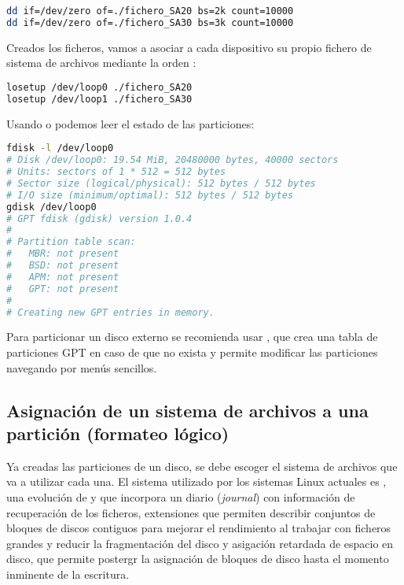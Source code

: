 \begin{lstlisting}[language=Bash]
dd if=/dev/zero of=./fichero_SA20 bs=2k count=10000
dd if=/dev/zero of=./fichero_SA30 bs=3k count=10000
\end{lstlisting}

Creados los ficheros, vamos a asociar a cada dispositivo  su propio fichero de sistema de archivos mediante la orden :

\begin{lstlisting}[language=Bash]
losetup /dev/loop0 ./fichero_SA20
losetup /dev/loop1 ./fichero_SA30
\end{lstlisting}

Usando  o  podemos leer el estado de las particiones:

\begin{lstlisting}[language=Bash]
fdisk -l /dev/loop0
# Disk /dev/loop0: 19.54 MiB, 20480000 bytes, 40000 sectors
# Units: sectors of 1 * 512 = 512 bytes
# Sector size (logical/physical): 512 bytes / 512 bytes
# I/O size (minimum/optimal): 512 bytes / 512 bytes
gdisk /dev/loop0
# GPT fdisk (gdisk) version 1.0.4
#
# Partition table scan:
#   MBR: not present
#   BSD: not present
#   APM: not present
#   GPT: not present
#
# Creating new GPT entries in memory.
\end{lstlisting}

Para particionar un disco externo se recomienda usar , que crea una tabla de particiones GPT en caso de que no exista y permite modificar las particiones navegando por menús sencillos.

\subsection{Asignación de un sistema de archivos a una partición (formateo lógico)}

Ya creadas las particiones de un disco, se debe escoger el sistema de archivos que va a utilizar cada una.
El sistema utilizado por los sistemas Linux actuales es , una evolución de  y  que incorpora un diario (\emph{journal}) con información de recuperación de los ficheros, extensiones que permiten describir conjuntos de bloques de discos contiguos para mejorar el rendimiento al trabajar con ficheros grandes y reducir la fragmentación del disco y asigación retardada de espacio en disco, que permite postergr la asignación de bloques de disco hasta el momento inminente de la escritura.

